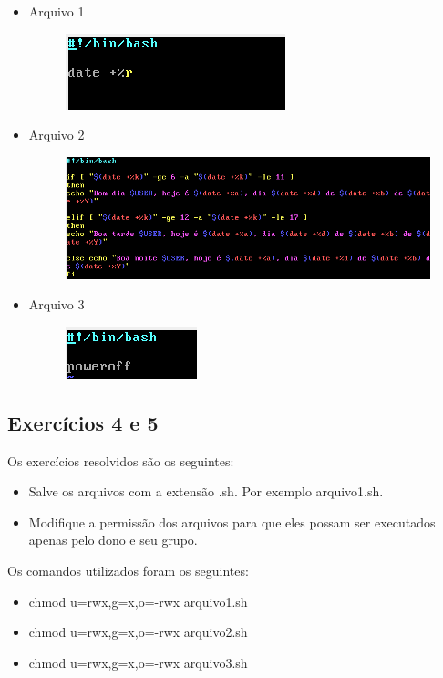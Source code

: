 \documentclass[
	12pt,				%
	openany,			%
	a4paper,			%
	chapter=TITLE,		%
	section=TITLE,		%
	english,
	brazil				%
]{abntex2}
\begin{document}
\begin{itemize}
	\item{Arquivo 1}
		\begin{figure}[htp]
  			\centering
  			\includegraphics[scale=0.7]{exe3-1.png}
		\end{figure}
	\item{Arquivo 2}
		\begin{figure}[htp]
  			\centering
  			\includegraphics[scale=0.5]{exe3-2.png}
		\end{figure}
	\item{Arquivo 3}
		\begin{figure}[htp]
  			\centering
  			\includegraphics[scale=0.7]{exe3-3.png}
		\end{figure}
\end{itemize}

\subsection{Exercícios 4 e 5}

Os exercícios resolvidos são os seguintes:
\begin{itemize}
	\item Salve os arquivos com a extensão .sh. Por exemplo arquivo1.sh.
	\item Modifique a permissão dos arquivos para que eles possam ser executados apenas pelo dono e seu grupo.
\end{itemize}

Os comandos utilizados foram os seguintes:

\begin{itemize}
	\item chmod u=rwx,g=x,o=-rwx arquivo1.sh
	\item chmod u=rwx,g=x,o=-rwx arquivo2.sh
	\item chmod u=rwx,g=x,o=-rwx arquivo3.sh
\end{itemize}
\end{document}
